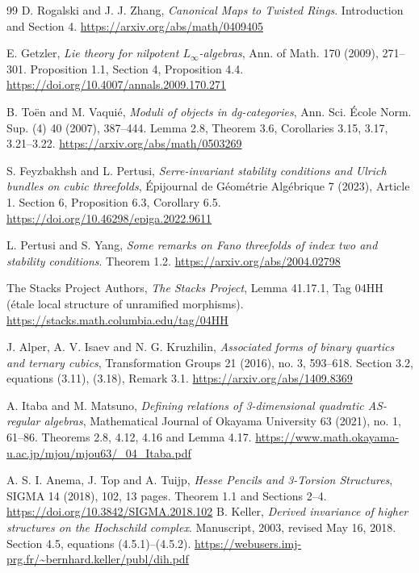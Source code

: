 \documentclass[a4paper,11pt]{ltjsarticle}
\theoremstyle{definition}
\begin{document}
\begin{thebibliography}{99}
D. Rogalski and J. J. Zhang,
\emph{Canonical Maps to Twisted Rings}.
Introduction and Section 4.
\url{https://arxiv.org/abs/math/0409405}

E. Getzler,
\emph{Lie theory for nilpotent $L_\infty$-algebras},
Ann. of Math. 170 (2009), 271--301.
Proposition 1.1, Section 4, Proposition 4.4.
\url{https://doi.org/10.4007/annals.2009.170.271}

B. To\"en and M. Vaqui\'e,
\emph{Moduli of objects in dg-categories},
Ann. Sci. \'Ecole Norm. Sup. (4) 40 (2007), 387--444.
Lemma 2.8, Theorem 3.6, Corollaries 3.15, 3.17, 3.21--3.22.
\url{https://arxiv.org/abs/math/0503269}

S. Feyzbakhsh and L. Pertusi,
\emph{Serre-invariant stability conditions and Ulrich bundles on cubic threefolds},
\'Epijournal de G\'eom\'etrie Alg\'ebrique 7 (2023), Article 1.
Section 6, Proposition 6.3, Corollary 6.5.
\url{https://doi.org/10.46298/epiga.2022.9611}

L. Pertusi and S. Yang,
\emph{Some remarks on Fano threefolds of index two and stability conditions}.
Theorem 1.2.
\url{https://arxiv.org/abs/2004.02798}

The Stacks Project Authors,
\emph{The Stacks Project},
Lemma 41.17.1, Tag 04HH (\'etale local structure of unramified morphisms).
\url{https://stacks.math.columbia.edu/tag/04HH}

J. Alper, A. V. Isaev and N. G. Kruzhilin,
\emph{Associated forms of binary quartics and ternary cubics},
Transformation Groups 21 (2016), no. 3, 593--618.
Section 3.2, equations (3.11), (3.18), Remark 3.1.
\url{https://arxiv.org/abs/1409.8369}

A. Itaba and M. Matsuno,
\emph{Defining relations of 3-dimensional quadratic AS-regular algebras},
Mathematical Journal of Okayama University 63 (2021), no. 1, 61--86.
Theorems 2.8, 4.12, 4.16 and Lemma 4.17.
\url{https://www.math.okayama-u.ac.jp/mjou/mjou63/_04_Itaba.pdf}

A. S. I. Anema, J. Top and A. Tuijp,
\emph{Hesse Pencils and 3-Torsion Structures},
SIGMA 14 (2018), 102, 13 pages.
Theorem 1.1 and Sections 2--4.
\url{https://doi.org/10.3842/SIGMA.2018.102}
B. Keller,
\emph{Derived invariance of higher structures on the Hochschild complex}.
Manuscript, 2003, revised May 16, 2018.
Section 4.5, equations (4.5.1)--(4.5.2).
\url{https://webusers.imj-prg.fr/~bernhard.keller/publ/dih.pdf}


\end{thebibliography}
\end{document}
